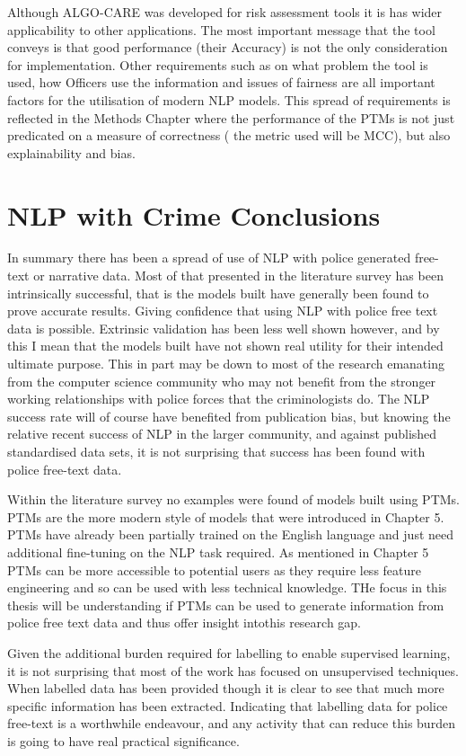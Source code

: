 Although ALGO-CARE was developed for risk assessment tools it is has wider applicability to other applications. The most important message that the tool conveys is that good performance (their Accuracy) is not the only consideration for implementation. Other requirements such as on what problem the tool is used, how Officers use the information and issues of fairness are all important factors for the utilisation of modern NLP models. This spread of requirements is reflected in the Methods Chapter where the performance of the PTMs is not just predicated on a measure of correctness ( the metric used will be MCC), but also explainability and bias. 


\section{ NLP with Crime Conclusions} In summary there has been a spread of use of NLP with police generated free-text or narrative data. Most of that presented in the literature survey has been intrinsically successful, that is the models built have generally been found to prove accurate results. Giving confidence that using NLP with police free text data is possible. Extrinsic validation has been less well shown however, and by this I mean that the models built have not shown real utility for their intended ultimate purpose.  This in part may be down to most of the research emanating from the computer science community who may not benefit from the stronger working relationships with police forces that the criminologists do. The NLP success rate will of course have benefited from publication bias, but knowing the relative recent success of NLP in the larger community, and against published standardised data sets,  it is not surprising that success has been found with police free-text data.

Within the literature survey no examples were found of models built using PTMs. PTMs are the more modern style of models that were introduced in Chapter 5. PTMs have already been partially trained on the English language and just need additional fine-tuning on the NLP task required.  As mentioned in Chapter 5 PTMs can be more accessible to potential users as they require less feature engineering and so can be used with less technical knowledge. THe focus in this thesis will be understanding if PTMs can be used to generate information from police free text data and thus offer insight intothis research gap.

Given the additional burden required for labelling to enable supervised learning, it is not surprising that most of the work has focused on unsupervised techniques. When labelled data has been provided though it is clear to see that much more specific information has been extracted. Indicating that labelling data for police free-text is a worthwhile endeavour, and any activity that can reduce this burden is going to have real practical significance. 


